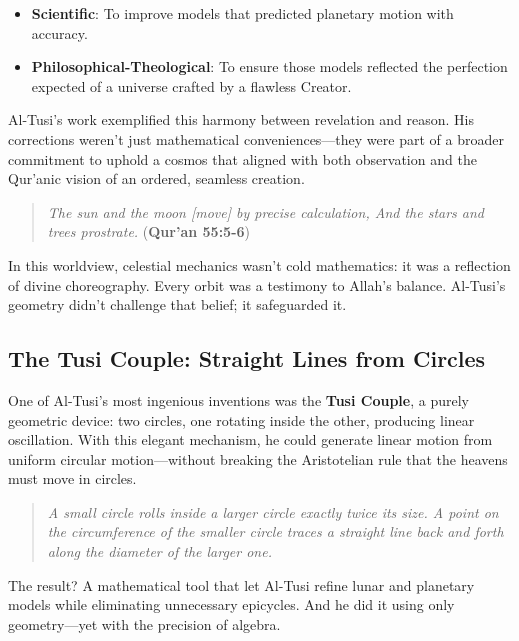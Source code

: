 \begin{tcolorbox}[colback=blue!5!white, colframe=blue!50!black, title={Historical Sidebar: Islamic Cosmology — Reading the Heavens Through Revelation and Reason}, breakable]
  \begin{itemize}
    \item \textbf{Scientific}: To improve models that predicted planetary motion with accuracy.
    \item \textbf{Philosophical-Theological}: To ensure those models reflected the perfection expected of a universe crafted by a flawless Creator.
  \end{itemize}
  
  Al-Tusi’s work exemplified this harmony between revelation and reason. His corrections weren’t just mathematical conveniences—they were part of a broader commitment to uphold a cosmos that aligned with both observation and the Qur'anic vision of an ordered, seamless creation.
  
  \begin{quote}
  \textit{The sun and the moon [move] by precise calculation,  And the stars and trees prostrate.}  
  \hfill (\textbf{Qur'an 55:5-6})
  \end{quote}
  
  In this worldview, celestial mechanics wasn’t cold mathematics: it was a reflection of divine choreography. Every orbit was a testimony to Allah's balance. Al-Tusi’s geometry didn’t challenge that belief; it safeguarded it.
  
\end{tcolorbox}


\subsection{The Tusi Couple: Straight Lines from Circles}

One of Al-Tusi’s most ingenious inventions was the \textbf{Tusi Couple}, a purely geometric device: two circles, one rotating inside the other, producing linear oscillation. With this elegant mechanism, he could generate linear motion from uniform circular motion—without breaking the Aristotelian rule that the heavens must move in circles.

\begin{quote}
\textit{A small circle rolls inside a larger circle exactly twice its size. A point on the circumference of the smaller circle traces a straight line back and forth along the diameter of the larger one.}
\end{quote}

The result? A mathematical tool that let Al-Tusi refine lunar and planetary models while eliminating unnecessary epicycles. And he did it using only geometry—yet with the precision of algebra.

